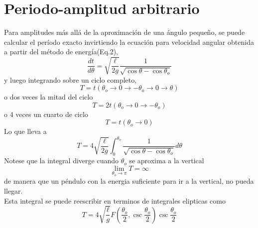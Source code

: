 \documentclass[12pt]{article}
\begin{document}
\section{Periodo-amplitud arbitrario}
Para amplitudes más allá de la aproximación de una ángulo pequeño, se puede calcular el período exacto invirtiendo la ecuación para velocidad angular obtenida a partir del método de energía(Eq.2),
$$\frac{dt}{d\theta}=\sqrt{\frac{\ell}{2g}}\frac{1}{\sqrt{\cos\theta-\cos\theta_o}}$$
y luego integrando sobre un ciclo completo,
$$ T=t(\theta_o\rightarrow 0 \rightarrow -\theta_o \rightarrow 0 \rightarrow \theta)$$
o dos veces la mitad del ciclo
$$ T=2t(\theta_o\rightarrow 0 \rightarrow -\theta_o )$$
o 4 veces un cuarto de ciclo
$$ T=t(\theta_o\rightarrow 0 )$$
Lo que lleva a
$$T=4\sqrt{\frac{\ell}{2g}}\int_0^{\theta_o} \frac{1}{\sqrt{\cos\theta-\cos\theta_o}} d\theta $$
Notese que la integral diverge cuando $\theta_o$ se aproxima a la vertical
$$\lim_{\theta_o\rightarrow \pi}T=\infty$$
de manera que un péndulo con la energia suficiente para ir a la vertical, no pueda llegar.\\
Esta integral se puede reescribir en terminos de integrales elipticas como
$$ T= 4\sqrt{\frac{\ell}{g}}F ( \frac{\theta_o}{2},\csc\frac{\theta_o}{2})\csc\frac{\theta_o}{2} $$
\end{document}
